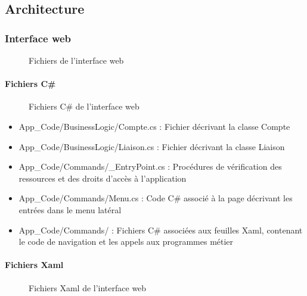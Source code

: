\documentclass[a4paper,french,12pt]{article}
\begin{document}
	\subsection{Architecture}
	
		\subsubsection{Interface web}
		
			\begin{figure}[h!]
			\caption{Fichiers de l'interface web}
			\centering
			\end{figure} 
			
				\paragraph{Fichiers C\#}
				
					\begin{figure}[h!]
					  \caption{Fichiers C\# de l'interface web}
					  \centering
					\end{figure} 
					
					\begin{itemize}
						\item App\_Code/BusinessLogic/Compte.cs : Fichier décrivant la classe Compte
						\item App\_Code/BusinessLogic/Liaison.cs : Fichier décrivant la classe Liaison
						\item App\_Code/Commands/\_EntryPoint.cs : Procédures de vérification des ressources et des droits d’accès à l’application
						\item App\_Code/Commands/Menu.cs	: Code C\# associé à la page décrivant les entrées dans le menu latéral
						\item App\_Code/Commands/\* : Fichiers C\# associées aux feuilles Xaml, contenant le code de navigation et les appels aux programmes métier
					\end{itemize}

				\paragraph{Fichiers Xaml}
				      \begin{figure}[h!]
					\caption{Fichiers Xaml de l'interface web}
					\centering
					\end{figure} 
					
\end{document}
